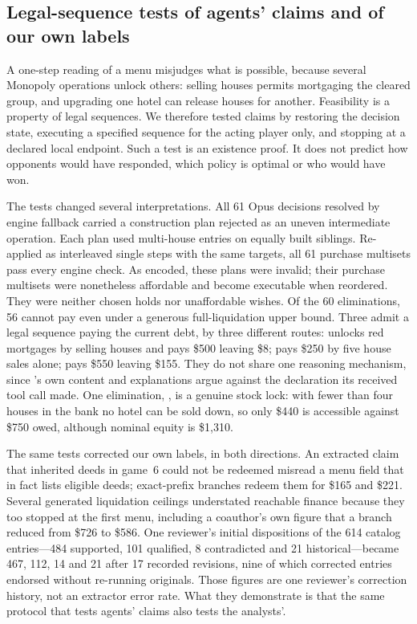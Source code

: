 \subsection{Legal-sequence tests of agents' claims and of our own labels}\label{sec:instrument-legal}

A one-step reading of a menu misjudges what is possible, because several Monopoly operations unlock others: selling houses permits mortgaging the cleared group, and upgrading one hotel can release houses for another. Feasibility is a property of legal sequences. We therefore tested claims by restoring the decision state, executing a specified sequence for the acting player only, and stopping at a declared local endpoint. Such a test is an existence proof. It does not predict how opponents would have responded, which policy is optimal or who would have won.

The tests changed several interpretations. All 61 Opus decisions resolved by engine fallback carried a construction plan rejected as an uneven intermediate operation. Each plan used multi-house entries on equally built siblings. Re-applied as interleaved single steps with the same targets, all 61 purchase multisets pass every engine check. As encoded, these plans were invalid; their purchase multisets were nonetheless affordable and become executable when reordered. They were neither chosen holds nor unaffordable wishes. Of the 60 eliminations, 56 cannot pay even under a generous full-liquidation upper bound. Three admit a legal sequence paying the current debt, by three different routes:  unlocks red mortgages by selling houses and pays \$500 leaving \$8;  pays \$250 by five house sales alone;  pays \$550 leaving \$155. They do not share one reasoning mechanism, since 's own content and explanations argue against the declaration its received tool call made. One elimination, , is a genuine stock lock: with fewer than four houses in the bank no hotel can be sold down, so only \$440 is accessible against \$750 owed, although nominal equity is \$1,310.

The same tests corrected our own labels, in both directions. An extracted claim that inherited deeds in game~6 could not be redeemed misread a menu field that in fact lists eligible deeds; exact-prefix branches redeem them for \$165 and \$221. Several generated liquidation ceilings understated reachable finance because they too stopped at the first menu, including a coauthor's own figure that a branch reduced from \$726 to \$586. One reviewer's initial dispositions of the 614 catalog entries---484 supported, 101 qualified, 8 contradicted and 21 historical---became 467, 112, 14 and 21 after 17 recorded revisions, nine of which corrected entries endorsed without re-running originals. Those figures are one reviewer's correction history, not an extractor error rate. What they demonstrate is that the same protocol that tests agents' claims also tests the analysts'.

